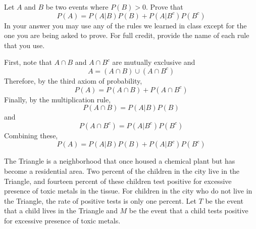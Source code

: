\documentclass[addpoints,12pt]{exam}
\begin{document}
\begin{questions}

\question[10] Let $A$ and $B$ be two events where $P(B)>0$. Prove that $$P(A) = P(A|B)P(B) + P(A|B^c)P(B^c)$$
In your answer you may use any of the rules we learned in class except for the one you are being asked to prove. For full credit, provide the name of each rule that you use. 
	\begin{solution}[2.5in]
		First, note that $A\cap B$ and $A \cap B^c$ are mutually exclusive and 
			$$A = (A\cap B) \cup (A \cap B^c)$$
	Therefore, by the third axiom of probability,
			$$P(A) = P(A\cap B) + P(A \cap B^c)$$
	Finally, by the multiplication rule,
		$$P(A\cap B) = P(A|B)P(B)$$
	and 
		$$P(A \cap B^c) = P(A|B^c)P(B^c)$$
		Combining these,
		$$P(A) = P(A|B)P(B) + P(A|B^c)P(B^c)$$
	\end{solution}

\question The Triangle is a neighborhood that once housed a chemical plant but has become a residential area. Two percent of the children in the city live in the Triangle, and fourteen percent of these children test positive for excessive presence of toxic metals in the tissue. For children in the city who do not live in the Triangle, the rate of positive tests is only one percent. Let $T$ be the event that a child lives in the Triangle and $M$ be the event that a child tests positive for excessive presence of toxic metals.
\end{questions}
\end{document}
